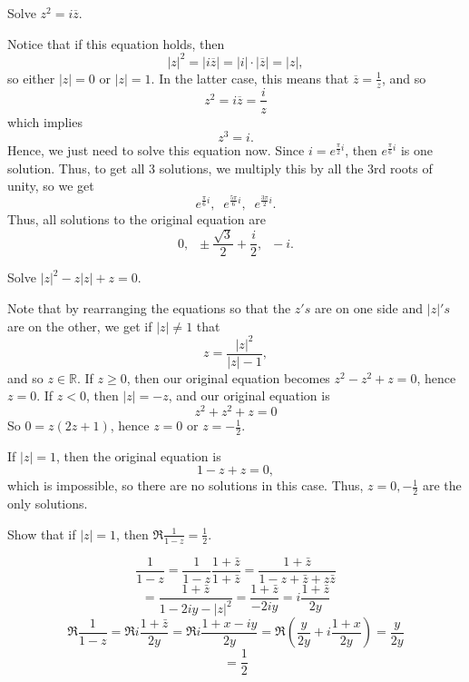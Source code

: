 \documentclass[11pt,dvipsnames]{book}
\def\R{\mathbb{R}}
\numberwithin{equation}{section} %
\numberwithin{figure}{section} %
\numberwithin{table}{section} %
\begin{document}
\begin{exercise} Solve $z^2=i\overline{z}$. 

\begin{solution}
Notice that if this equation holds, then
\[
|z|^2=|i\overline{z}|=|i|\cdot |\overline{z}| = |z|,\]
so either $|z|=0$ or $|z|=1$. In the latter case, this means that $\overline{z} = \frac{1}{z}$, and so
\[
z^2=i\overline{z} = \frac{i}{z}\]
which implies
\[
z^3=i.
\]
Hence, we just need to solve this equation now. Since $i=e^{\frac{\pi}{2}i}$, then $e^{\frac{\pi}{6}i}$ is one solution. Thus, to get all 3 solutions, we multiply this by all the 3rd roots of unity, so we get
\[
e^{\frac{\pi}{6}i}, \;\; e^{\frac{5\pi}{6}i}, \;\; e^{\frac{3\pi}{2}i}.
\]
Thus, all solutions to the original equation are 
\[
0, \;\; \pm \frac{\sqrt{3}}{2}+\frac{i}{2}, \;\; -i.
\]

\end{solution}


\end{exercise}







\begin{exercise} Solve $|z|^2 - z|z| + z = 0$. 

\begin{solution}
Note that by rearranging the equations so that the $z's$ are on one side and $|z|'s$ are on the other, we get if $|z|\neq 1$ that 
\[
z  =\frac{|z|^{2}}{|z|-1},\]
and so $z\in\R$. If $z\geq 0$, then our original equation becomes $z^2-z^2+z=0$, hence $z=0$. If $z<0$, then $|z|=-z$, and our original equation is 
\[
z^2+z^2+z=0\]
So $0=z(2z+1)$, hence $z=0$ or $z=-\frac{1}{2}$. 

If $|z|=1$, then the original equation is
\[
1-z+z=0,\]
which is impossible, so there are no solutions in this case. Thus, $z=0,-\frac{1}{2}$ are the only solutions.
\end{solution}


\end{exercise}




\begin{exercise} Show that if $|z| = 1$, then $\Re\frac{1}{1-z} =
\frac{1}{2}$.

\begin{solution}
\[ \frac{1}{1-z} = \frac{1}{1-z}\frac{1+\bar{z}}{1+\bar{z}} =
\frac{1+\bar{z}}{1-z+\bar{z} + z\bar{z}}\]
\[ =
\frac{1+\bar{z}}{1-2iy-|z|^{2}}=\frac{1+\bar{z}}{-2iy}=i\frac{1+\bar{z}}{2y}\]
\[\Re \frac{1}{1-z} = \Re i\frac{1+\bar{z}}{2y} = \Re
i\frac{1+x-iy}{2y} = \Re\left(\frac{y}{2y} + i\frac{1+x}{2y}\right) =
\frac{y}{2y}\]
\[=\frac{1}{2}\]
\end{solution}


\end{exercise}
\end{document}
